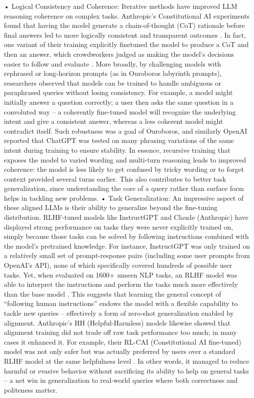 \documentclass{article}
\begin{document}
	•	Logical Consistency and Coherence: Iterative methods have improved LLM reasoning coherence on complex tasks. Anthropic’s Constitutional AI experiments found that having the model generate a chain-of-thought (CoT) rationale before final answers led to more logically consistent and transparent outcomes . In fact, one variant of their training explicitly finetuned the model to produce a CoT and then an answer, which crowdworkers judged as making the model’s decisions easier to follow and evaluate . More broadly, by challenging models with rephrased or long-horizon prompts (as in Ouroboros labyrinth prompts), researchers observed that models can be trained to handle ambiguous or paraphrased queries without losing consistency. For example, a model might initially answer a question correctly; a user then asks the same question in a convoluted way – a coherently fine-tuned model will recognize the underlying intent and give a consistent answer, whereas a less coherent model might contradict itself. Such robustness was a goal of Ouroboros, and similarly OpenAI reported that ChatGPT was tested on many phrasing variations of the same intent during training to ensure stability. In essence, recursive training that exposes the model to varied wording and multi-turn reasoning leads to improved coherence: the model is less likely to get confused by tricky wording or to forget context provided several turns earlier. This also contributes to better task generalization, since understanding the core of a query rather than surface form helps in tackling new problems.
	•	Task Generalization: An impressive aspect of these aligned LLMs is their ability to generalize beyond the fine-tuning distribution. RLHF-tuned models like InstructGPT and Claude (Anthropic) have displayed strong performance on tasks they were never explicitly trained on, simply because those tasks can be solved by following instructions combined with the model’s pretrained knowledge. For instance, InstructGPT was only trained on a relatively small set of prompt-response pairs (including some user prompts from OpenAI’s API), none of which specifically covered hundreds of possible user tasks. Yet, when evaluated on 1600+ unseen NLP tasks, an RLHF model was able to interpret the instructions and perform the tasks much more effectively than the base model  . This suggests that learning the general concept of “following human instructions” endows the model with a flexible capability to tackle new queries – effectively a form of zero-shot generalization enabled by alignment. Anthropic’s HH (Helpful-Harmless) models likewise showed that alignment training did not trade off raw task performance too much; in many cases it enhanced it. For example, their RL-CAI (Constitutional AI fine-tuned) model was not only safer but was actually preferred by users over a standard RLHF model at the same helpfulness level  . In other words, it managed to reduce harmful or evasive behavior without sacrificing its ability to help on general tasks – a net win in generalization to real-world queries where both correctness and politeness matter.
\end{document}

